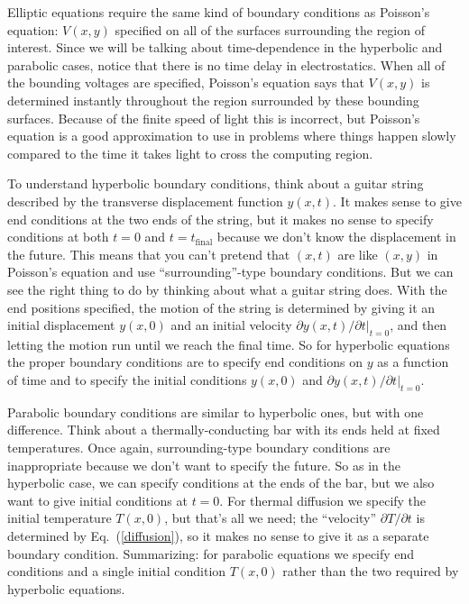 
Elliptic equations require the same kind of boundary conditions as
Poisson's equation: $V(x,y)$ specified on all of the surfaces
surrounding the region of interest. Since we will be talking about
time-dependence in the hyperbolic and parabolic cases, notice that
there is no time delay in electrostatics. When all of the bounding
voltages are specified, Poisson's equation says that $V(x,y)$ is
determined instantly throughout the region surrounded by these
bounding surfaces. Because of the finite speed of light this is
incorrect, but Poisson's equation is a good approximation to use in
problems where things happen slowly compared to the time it takes
light to cross the computing region.

To understand hyperbolic boundary conditions, think about a guitar
string described by the transverse displacement function $y(x,t)$.
It makes sense to give end conditions at the two ends of the string,
but it makes no sense to specify conditions at both $t=0$ and
$t=t_\mathrm{final}$ because we don't know the displacement in the future.
This means that you can't pretend that $(x,t)$ are like $(x,y)$ in
Poisson's equation and use ``surrounding''-type boundary conditions.
But we can see the right thing to do by thinking about what a guitar
string does. With the end positions specified, the motion of the
string is determined by giving it an initial displacement $y(x,0)$
and an initial velocity $\partial y(x,t) / \partial t |_{t=0}$, and
then letting the motion run until we reach the final time. So for
hyperbolic equations the proper boundary conditions are to specify
end conditions on $y$ as a function of time and to specify the
initial conditions $y(x,0)$ and $\partial y(x,t)/\partial t|_{t=0}$.

Parabolic boundary conditions are similar to hyperbolic ones, but
with one difference. Think about a thermally-conducting bar with its
ends held at fixed temperatures. Once again, surrounding-type
boundary conditions are inappropriate because we don't want to
specify the future. So as in the hyperbolic case, we can specify
conditions at the ends of the bar, but we also want to give initial
conditions at $t=0$. For thermal diffusion we specify the initial
temperature $T(x,0)$, but that's all we need; the ``velocity''
$\partial T / \partial t$ is determined by Eq.~(\ref{diffusion}), so
it makes no sense to give it as a separate boundary condition.
Summarizing: for parabolic equations we specify end conditions and a
single initial condition $T(x,0)$ rather than the two required by
hyperbolic equations.

